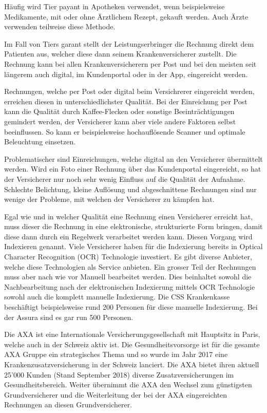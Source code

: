 \documentclass{article}
\begin{document}
Häufig wird Tier payant in Apotheken verwendet, wenn beispielsweise Medikamente, mit oder ohne Ärztlichem Rezept, gekauft werden. Auch Ärzte verwenden teilweise diese Methode.

Im Fall von Tiers garant stellt der Leistungserbringer die Rechnung direkt dem Patienten aus, welcher diese dann seinem Krankenversicherer zustellt. Die Rechnung kann bei allen Krankenversicherern per Post und bei den meisten seit längerem auch digital, im Kundenportal oder in der App, eingereicht werden.

Rechnungen, welche per Post oder digital beim Versichrerer eingereicht werden, erreichen diesen in unterschiedlichster Qualität. Bei der Einreichung per Post kann die Qualität durch Kaffee-Flecken oder sonstige Beeinträchtigungen gemindert werden, der Versicherer kann aber viele andere Faktoren selbst beeinflussen. So kann er beispielsweise hochauflösende Scanner und optimale Beleuchtung einsetzen.

Problematischer sind Einreichungen, welche digital an den Versicherer übermittelt werden. Wird ein Foto einer Rechnung über das Kundenportal eingereicht, so hat der Versicherer nur noch sehr wenig Einfluss auf die Qualität der Aufnahme. Schlechte Belichtung, kleine Auflösung und abgeschnittene Rechnungen sind nur wenige der Probleme, mit welchen der Versicherer zu kämpfen hat.

Egal wie und in welcher Qualität eine Rechnung einen Versicherer erreicht hat, muss dieser die Rechnung in eine elektronische, strukturierte Form bringen, damit diese dann durch ein Regelwerk verarbeitet werden kann. Diesen Vorgang wird Indexieren genannt. Viele Versicherer haben für die Indexierung bereits in Optical Character Recognition (OCR) Technologie investiert. Es gibt diverse Anbieter, welche diese Technologien als Service anbieten. Ein grosser Teil der Rechnungen muss aber nach wie vor Manuell bearbeitet werden. Dies beinhaltet sowohl die Nachbearbeitung nach der elektronischen Indexierung mittels OCR Technologie sowohl auch die komplett manuelle Indexierung. Die CSS Krankenkasse beschäftigt beispielsweise rund 200 Personen für diese manuelle Indexierung. Bei der Assura sind es gar run 500 Personen.

Die AXA ist eine Internationale Versicherungsgesellschaft mit Hauptsitz in Paris, welche auch in der Schweiz aktiv ist. Die Gesundheitsvorsorge ist für die gesamte AXA Gruppe ein strategisches Thema und so wurde im Jahr 2017 eine Krankenzusatzversicherung in der Schweiz lanciert. Die AXA bietet ihren aktuell 25'000 Kunden (Stand September 2018) diverse Zusatzversicherungen im Gesundheitsbereich. Weiter übernimmt die AXA den Wechsel zum günstigsten Grundversicherer und die Weiterleitung der bei der AXA eingereichten Rechnungen an diesen Grundversicherer.
\end{document}
